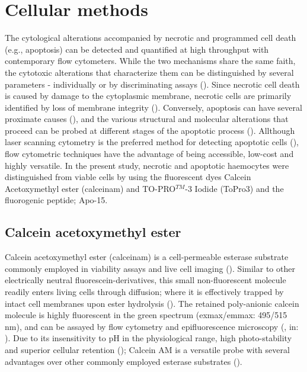\section{Cellular methods}
The cytological alterations accompanied by necrotic and programmed cell death (e.g., apoptosis) can be detected and quantified at high throughput with contemporary flow cytometers. While the two mechanisms share the same faith, the cytotoxic alterations that characterize them can be distinguished by several parameters - individually or by discriminating assays (\cite{Shapiro2003}). Since necrotic cell death is caused by damage to the cytoplasmic membrane, necrotic cells are primarily identified by loss of membrane integrity (\cite{Shapiro2003}). Conversely, apoptosis can have several proximate causes (\cite{Bedoui2020}), and the various structural and molecular alterations that proceed can be probed at different stages of the apoptotic process (\cite{Kari2022}). Allthough laser scanning cytometry is the preferred method for detecting apoptotic cells (\cite{Darzynkiewicz2001}), flow cytometric techniques have the advantage of being accessible, low-cost and highly versatile. In the present study, necrotic and apoptotic haemocytes were distinguished from viable cells by using the fluorescent dyes Calcein Acetoxymethyl ester (\acrshort{calceinam}) and TO-PRO$^{TM}$-3 Iodide (ToPro3) and the fluorogenic peptide; Apo-15.

\subsection{Calcein acetoxymethyl ester}
Calcein acetoxymethyl ester (\acrshort{calceinam}) is a cell-permeable esterase substrate commonly employed in viability assays and live cell imaging (\cite{Ramirez2010}). Similar to other electrically neutral fluorescein-derivatives, this small non-fluorescent molecule readily enters living cells through diffusion; where it is effectively trapped by intact cell membranes upon ester hydrolysis (\cite{Kaneshiro1993}). The retained poly-anionic calcein molecule is highly fluorescent in the green spectrum (\acrshort{exmax}/\acrshort{emmax}: 495/515 nm), and can be assayed by flow cytometry and epifluorescence microscopy (\cite{Wallach1959}, in: \cite{Chiu1977}). Due to its insensitivity to pH in the physiological range, high photo-stability and superior cellular retention (\cite{Chiu1977, Kaneshiro1993}); Calcein AM is a versatile probe with several advantages over other commonly employed esterase substrates (\cite{Ramirez2010}).

